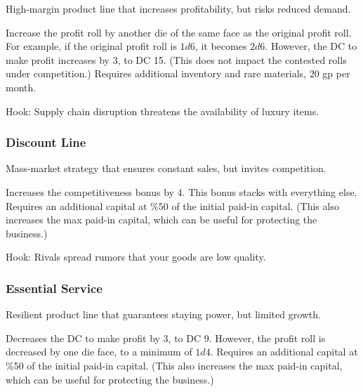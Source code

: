 \documentclass[twocolumn]{dndbook}
\begin{document}
High-margin product line that increases profitability, but risks reduced demand.

\begin{DndComment}[color=bgtan2018]{}
	Increase the profit roll by another die of the same face as the original profit roll.
	For example, if the original profit roll is $1d6$, it becomes $2d6$.
	However, the DC to make profit increases by 3, to DC 15.
	(This does not impact the contested rolls under competition.)
	Requires additional inventory and rare materials, 20 gp per month.
\end{DndComment}

Hook: Supply chain disruption threatens the availability of luxury items.\par


\subsubsection{Discount Line}


Mass-market strategy that ensures constant sales, but invites competition.\par

\begin{DndComment}[color=bgtan2018]{}
	Increases the competitiveness bonus by 4.
	This bonus stacks with everything else.
	Requires an additional capital at \%50 of the initial paid-in capital.
	(This also increases the max paid-in capital, which can be useful for protecting the business.)
\end{DndComment}

Hook: Rivals spread rumors that your goods are low quality.\par


\subsubsection{Essential Service}

Resilient product line that guarantees staying power, but limited growth.\par

\begin{DndComment}[color=bgtan2018]{}
	Decreases the DC to make profit by 3, to DC 9.
	However, the profit roll is decreased by one die face, to a minimum of $1d4$.
	Requires an additional capital at \%50 of the initial paid-in capital.
	(This also increases the max paid-in capital, which can be useful for protecting the business.)
\end{DndComment}
\end{document}
